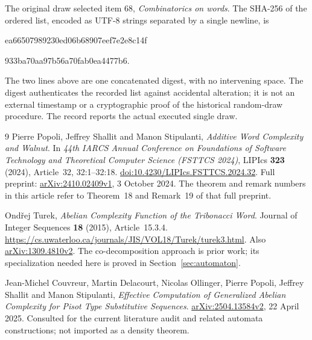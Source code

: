 \documentclass[11pt,a4paper]{article}
\theoremstyle{definition}
\theoremstyle{remark}
\begin{document}
The original draw selected item $68$, \emph{Combinatorics on words}.
The SHA-256 of the ordered list, encoded as UTF-8 strings separated by a
single newline, is
\begin{center}\small\ttfamily
 ea66507989230ed06b68907eef7e2e8c14f\par
 933ba70aa97b56a70fab0ea4477b6.
\end{center}
The two lines above are one concatenated digest, with no intervening space.
The digest authenticates the recorded list against accidental alteration;
it is not an external timestamp or a cryptographic proof of the historical
random-draw procedure. The record reports the actual executed single draw.

\begin{thebibliography}{9}
Pierre Popoli, Jeffrey Shallit and Manon Stipulanti,
\emph{Additive Word Complexity and Walnut}.
In \emph{44th IARCS Annual Conference on Foundations of Software Technology
and Theoretical Computer Science (FSTTCS 2024)},
LIPIcs \textbf{323} (2024), Article~32, 32:1--32:18.
\href{https://doi.org/10.4230/LIPIcs.FSTTCS.2024.32}{doi:10.4230/LIPIcs.FSTTCS.2024.32}.
Full preprint: \href{https://arxiv.org/abs/2410.02409v1}{arXiv:2410.02409v1},
3 October 2024. The theorem and remark numbers in this article refer to
Theorem~18 and Remark~19 of that full preprint.

Ond\v{r}ej Turek,
\emph{Abelian Complexity Function of the Tribonacci Word}.
Journal of Integer Sequences \textbf{18} (2015), Article~15.3.4.
\url{https://cs.uwaterloo.ca/journals/JIS/VOL18/Turek/turek3.html}.
Also \href{https://arxiv.org/abs/1309.4810v2}{arXiv:1309.4810v2}.
The co-decomposition approach is prior work; its specialization needed here
is proved in Section~\ref{sec:automaton}.

Jean-Michel Couvreur, Martin Delacourt, Nicolas Ollinger, Pierre Popoli,
Jeffrey Shallit and Manon Stipulanti,
\emph{Effective Computation of Generalized Abelian Complexity for Pisot Type
Substitutive Sequences}.
\href{https://arxiv.org/abs/2504.13584v2}{arXiv:2504.13584v2},
22 April 2025. Consulted for the current literature audit and related
automata constructions; not imported as a density theorem.
\end{thebibliography}
\end{document}
